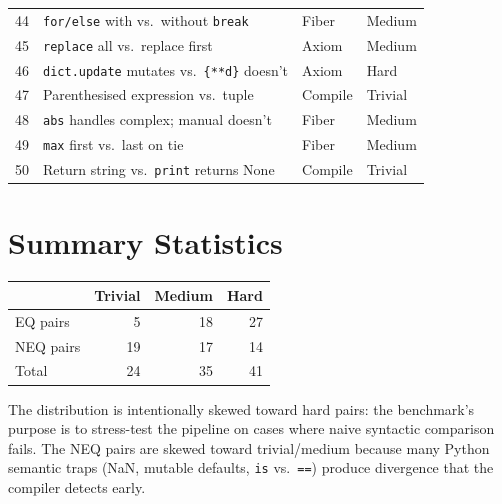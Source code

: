 \begin{center}
\begin{tabular}{r p{5cm} l l}
  44 & \texttt{for/else} with vs.\ without \texttt{break} &
       Fiber & Medium \\
  45 & \texttt{replace} all vs.\ replace first &
       Axiom & Medium \\
  46 & \texttt{dict.update} mutates vs.\ \texttt{\{**d\}} doesn't &
       Axiom & Hard \\
  47 & Parenthesised expression vs.\ tuple &
       Compile & Trivial \\
  48 & \texttt{abs} handles complex; manual doesn't &
       Fiber & Medium \\
  49 & \texttt{max} first vs.\ last on tie &
       Fiber & Medium \\
  50 & Return string vs.\ \texttt{print} returns None &
       Compile & Trivial \\
\end{tabular}
\end{center}

\section{Summary Statistics}

\begin{center}
\begin{tabular}{l r r r}
  & \textbf{Trivial} & \textbf{Medium} & \textbf{Hard} \\
  \hline
  EQ pairs  & 5  & 18 & 27 \\
  NEQ pairs & 19 & 17 & 14 \\
  \hline
  Total     & 24 & 35 & 41 \\
\end{tabular}
\end{center}

\noindent
The distribution is intentionally skewed toward hard pairs: the
benchmark's purpose is to stress-test the pipeline on cases where
naive syntactic comparison fails.  The NEQ pairs are skewed toward
trivial/medium because many Python semantic traps (NaN, mutable
defaults, \texttt{is} vs.\ \texttt{==}) produce divergence that
the compiler detects early.



